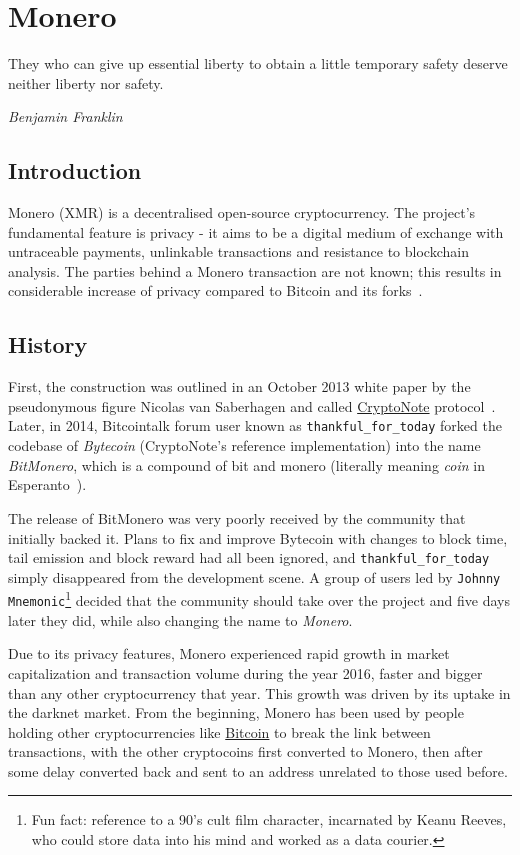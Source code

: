 \chapter{Monero} \label{sec:Monero}
%
\epigraph{They who can give up essential liberty to obtain a little temporary safety deserve neither liberty nor safety.}{\emph{Benjamin Franklin}}
%
\section{Introduction}
Monero (XMR) is a decentralised open-source cryptocurrency. The project's fundamental feature is privacy - it aims to be a digital medium of exchange with untraceable payments, unlinkable transactions and resistance to blockchain analysis. The parties behind a Monero transaction are not known; this results in considerable increase of privacy compared to Bitcoin and its forks~\cite{monero}.

\section{History}
First, the construction was outlined in an October 2013 white paper by the pseudonymous figure Nicolas van Saberhagen and called \hyperref[sec:CryptoNote]{CryptoNote}  protocol~\cite{citeulike:14139412}. Later, in 2014, Bitcointalk forum user known as \verb|thankful_for_today| forked the codebase of \emph{Bytecoin} (CryptoNote's reference implementation) into the name \emph{BitMonero}, which is a compound of bit and monero (literally meaning \emph{coin} in Esperanto~\cite{esperanto}).

The release of BitMonero was very poorly received by the community that initially backed it. Plans to fix and improve Bytecoin with changes to block time, tail emission and block reward had all been ignored, and \verb|thankful_for_today| simply disappeared from the development scene. A group of users led by \verb|Johnny Mnemonic|\footnote{Fun fact: reference to a 90's cult film character, incarnated by Keanu Reeves, who could store data into his mind and worked as a data courier.} decided that the community should take over the project and five days later they did, while also changing the name to \emph{Monero}.
\pagebreak

Due to its privacy features, Monero experienced rapid growth in market capitalization and transaction volume during the year 2016, faster and bigger than any other cryptocurrency that year. This growth was driven by its uptake in the darknet market. From the beginning, Monero has been used by people holding other cryptocurrencies like \hyperref[sec:Bitcoin]{Bitcoin} to break the link between transactions, with the other cryptocoins first converted to Monero, then after some delay converted back and sent to an address unrelated to those used before.

